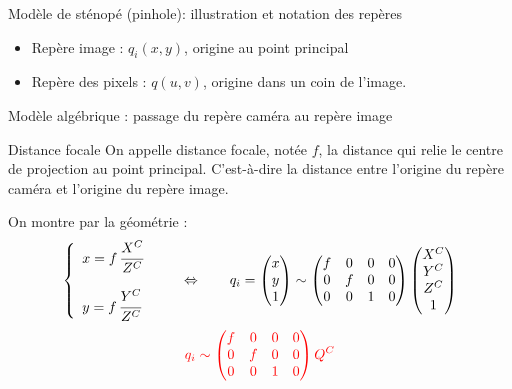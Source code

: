 \documentclass[8pt]{beamer}
\begin{document}
\begin{frame}{Modèle de sténopé (pinhole): illustration et notation des repères}
\begin{itemize}
			\item Repère image : $q_i\left( x, y \right)$, origine au point principal
			\item \alert<2>{Repère des pixels : $q\left( u, v \right)$, origine dans un coin de l'image.}
		\end{itemize}
	\end{frame}
	\begin{frame}{Modèle algébrique : passage du repère caméra au repère image}
		\begin{block}{Distance focale}
			On appelle distance focale, notée $f$, la distance qui relie le centre de projection au point principal. C'est-à-dire la distance entre l'origine du repère caméra et l'origine du repère image.
		\end{block}
		On montre par la géométrie :
		$$
		\left\{\begin{array}{l}
		x = f\,\cfrac{X^C}{Z^C}\\\null\\
		y = f\,\cfrac{Y^C}{Z^C}
		\end{array}\right. \qquad \Leftrightarrow \qquad
		q_i = \begin{pmatrix}
		x \\ y \\ 1
		\end{pmatrix} \sim
		\begin{pmatrix}
		f & 0 & 0 & 0 \\ 0 & f & 0 & 0 \\ 0 & 0 & 1 & 0
		\end{pmatrix}\begin{pmatrix}
		X^C \\ Y^C \\ Z^C \\ 1
		\end{pmatrix}
		$$
		$${\color{red}
			q_i \sim \begin{pmatrix}
			f & 0 & 0 & 0 \\ 0 & f & 0 & 0 \\ 0 & 0 & 1 & 0
			\end{pmatrix}Q^C}
		$$
	\end{frame}
\end{document}
